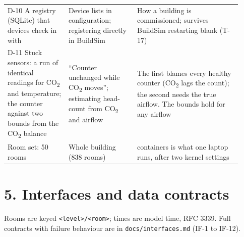 \documentclass[11pt]{article}
\newcommand{\cotwo}{CO\textsubscript{2}}
\begin{document}
\begin{longtable}[]{@{}>{\raggedright\arraybackslash}p{0.24\linewidth}>{\raggedright\arraybackslash}p{0.27\linewidth}>{\raggedright\arraybackslash}p{0.41\linewidth}@{}}
D-10 A registry (SQLite) that devices check in with & Device lists in configuration; registering directly in BuildSim & How a building is commissioned; survives BuildSim restarting blank (T-17) \\
D-11 Stuck sensors: a run of identical readings for \cotwo{} and temperature; the counter against two bounds from the \cotwo{} balance & ``Counter unchanged while \cotwo{} moves''; estimating head-count from \cotwo{} and airflow & The first blames every healthy counter (\cotwo{} lags the count); the second needs the true airflow. The bounds hold for any airflow \\
Room set: 50 rooms & Whole building (838 rooms) & 260 containers is what one laptop runs, after two kernel settings \\
\bottomrule
\end{longtable}

\section{5. Interfaces and data contracts}

Rooms are keyed \texttt{<level>/<room>}; times are model time, RFC 3339. Full contracts with
failure behaviour are in \texttt{docs/interfaces.md} (IF-1 to IF-12).
\end{document}
